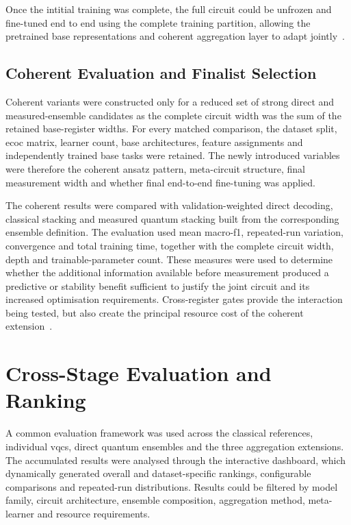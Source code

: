 \documentclass[]{UCD_CS_MSc_AAI_Report}
\begin{document}
Once the intitial training was complete, the full circuit could be unfrozen and fine-tuned end to end using the complete training partition, allowing the pretrained base representations and coherent aggregation layer to adapt jointly~\cite{friedrich_quantum_2025,du_quantum_2025}.

\subsection{Coherent Evaluation and Finalist Selection}
Coherent variants were constructed only for a reduced set of strong direct and measured-ensemble candidates as the complete circuit width was the sum of the retained base-register widths. For every matched comparison, the dataset split, \ac{ecoc} matrix, learner count, base architectures, feature assignments and independently trained base tasks were retained. The newly introduced variables were therefore the coherent ansatz pattern, meta-circuit structure, final measurement width and whether final end-to-end fine-tuning was applied.

The coherent results were compared with validation-weighted direct decoding, classical stacking and measured quantum stacking built from the corresponding ensemble definition. The evaluation used mean macro-\acs{f1}, repeated-run variation, convergence and total training time, together with the complete circuit width, depth and trainable-parameter count. These measures were used to determine whether the additional information available before measurement produced a predictive or stability benefit sufficient to justify the joint circuit and its increased optimisation requirements. Cross-register gates provide the interaction being tested, but also create the principal resource cost of the coherent extension~\cite{resch_quantum_2019,park_addressing_2025}.

\section{Cross-Stage Evaluation and Ranking}
\label{sec:method-evaluation-ranking}

A common evaluation framework was used across the classical references, individual \acp{vqc}, direct quantum ensembles and the three aggregation extensions. The accumulated results were analysed through the interactive dashboard, which dynamically generated overall and dataset-specific rankings, configurable comparisons and repeated-run distributions. Results could be filtered by model family, circuit architecture, ensemble composition, aggregation method, meta-learner and resource requirements.
\end{document}
